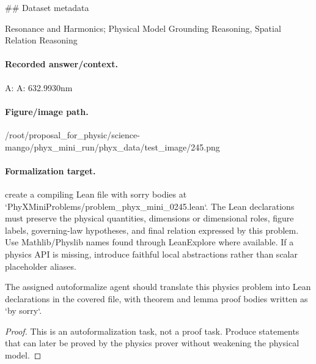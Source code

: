 \#\# Dataset metadata

Resonance and Harmonics; Physical Model Grounding Reasoning, Spatial Relation Reasoning

\paragraph{Recorded answer/context.}
A: A: 632.9930nm

\paragraph{Figure/image path.}
/root/proposal\_for\_physic/science-mango/phyx\_mini\_run/phyx\_data/test\_image/245.png

\paragraph{Formalization target.}
create a compiling Lean file with sorry bodies at `PhyXMiniProblems/problem\_phyx\_mini\_0245.lean`. The Lean declarations must preserve the physical quantities, dimensions or dimensional roles, figure labels, governing-law hypotheses, and final relation expressed by this problem.
Use Mathlib/Physlib names found through LeanExplore where available. If a physics API is missing, introduce faithful local abstractions rather than scalar placeholder aliases.

\begin{theorem}
\label{thm:physics:phyx_mini_0245:target}
The assigned autoformalize agent should translate this physics problem into Lean declarations in the covered file, with theorem and lemma proof bodies written as `by sorry`.
\end{theorem}
\begin{proof}
This is an autoformalization task, not a proof task. Produce statements that can later be proved by the physics prover without weakening the physical model.
\end{proof}

